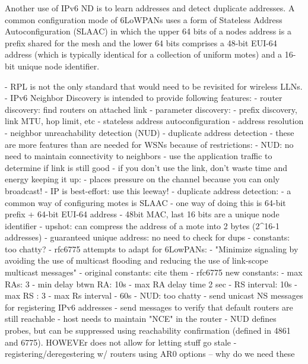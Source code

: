 Another use of IPv6 ND is to learn addresses and detect duplicate addresses.
A common configuration mode of 6LoWPANs uses a form of Stateless Address Autoconfiguration (SLAAC) in which the upper 64 bits of a nodes address is a prefix shared for the mesh and the lower 64 bits comprises a 48-bit EUI-64 address (which is typically identical for a collection of uniform motes) and a 16-bit unique node identifier.


- RPL is not the only standard that would need to be revisited for wireless LLNs.
- IPv6 Neighbor Discovery is intended to provide following features:
    - router discovery: find routers on attached link
    - parameter discovery:
        - prefix discovery, link MTU, hop limit, etc
    - stateless address autoconfiguration
    - address resolution
    - neighbor unreachability detection (NUD)
    - duplicate address detection
- these are more features than are needed for WSNs because of restrictions:
    - NUD: no need to maintain connectivity to neighbors
        - use the application traffic to determine if link is still good
        - if you don't use the link, don't waste time and energy keeping it up:
            - places pressure on the channel because you can only broadcast!
        - IP is best-effort: use this leeway!
    - duplicate address detection:
        - a common way of configuring motes is SLAAC
        - one way of doing this is 64-bit prefix + 64-bit EUI-64 address
        - 48bit MAC, last 16 bits are a unique node identifier
        - upshot: can compress the address of a mote into 2 bytes (2^16-1 addresses)
        - guaranteed unique address: no need to check for dups
- constants: too chatty?
    - rfc6775 attempts to adapt for 6LowPANs:
    - "Minimize signaling by avoiding the use of multicast
      flooding and reducing the use of link-scope multicast messages"
    - original constants: cite them
    - rfc6775 new constants:
        - max RAs: 3
        - min delay btwn RA: 10s
        - max RA delay time 2 sec
        - RS interval: 10s
        - max RS : 3
        - max Rs interval - 60s
- NUD: too chatty
    - send unicast NS messages for registering IPv6 addresses
    - send messages to verify that default routers are still reachable
    - host needs to maintain "NCE" in the router
    - NUD defines probes, but can be suppressed using reachability confirmation
      (defined in 4861 and 6775). HOWEVEr does not allow for letting stuff go stale
    - registering/deregestering w/ routers using AR0 options -- why do we need these
\fi
